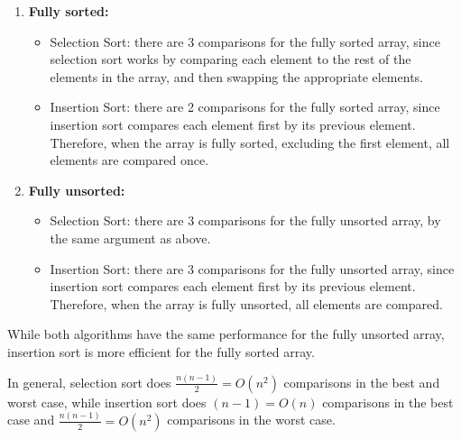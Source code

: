 \documentclass[addpoints]{exam}
\begin{document}
\begin{questions}
\begin{solution}
    \begin{enumerate}
      \item \textbf{Fully sorted:} \begin{itemize}
        \item Selection Sort: there are 3 comparisons for the fully sorted array, since selection sort works by comparing each element to the rest of the elements in the array, and then swapping the appropriate elements. 
        \item Insertion Sort: there are 2 comparisons for the fully sorted array, since insertion sort compares each element first by its previous element. Therefore, when the array is fully sorted, excluding the first element, all elements are compared once.
      \end{itemize}
      \item \textbf{Fully unsorted:} \begin{itemize}
        \item Selection Sort: there are 3 comparisons for the fully unsorted array, by the same argument as above.
        \item Insertion Sort: there are 3 comparisons for the fully unsorted array, since insertion sort compares each element first by its previous element. Therefore, when the array is fully unsorted, all elements are compared.
      \end{itemize}
    \end{enumerate}

    While both algorithms have the same performance for the fully unsorted array, insertion sort is more efficient for the fully sorted array.
    
    In general, selection sort does $ \frac{n(n - 1)}{2} = O(n^2) $ comparisons in the best and worst case, while insertion sort does $ (n - 1) = O(n) $ comparisons in the best case and $ \frac{n(n - 1)}{2} = O(n^2) $ comparisons in the worst case.

  \end{solution}

\end{questions}
\end{document}
